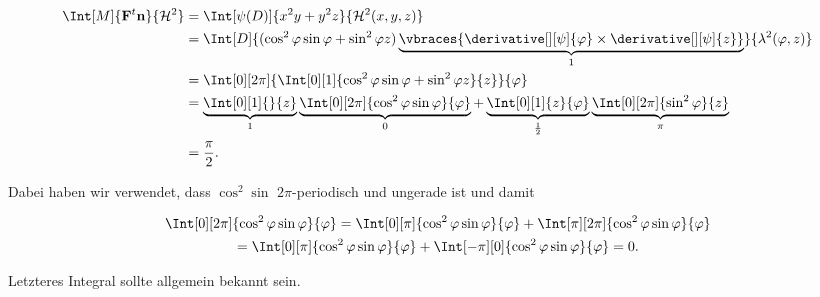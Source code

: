 \begin{solution}
\begin{enumerate}
    \begin{align*}
        \Int[M]
        {
            \mathbf F^t \mathbf n
        }{
            \mathcal H^2
        }
        & =
        \Int[\psi(D)]
        {
            x^2 y + y^2 z
        }{
            \mathcal H^2(x, y, z)
        } \\
        & =
        \Int[D]
        {
            (
                \cos^2 \varphi \sin \varphi
                +
                \sin^2 \varphi z
            )
            \underbrace
            {
                \vbraces
                {
                    \derivative[][\psi]{\varphi}
                    \times
                    \derivative[][\psi]{z}
                }
            }_1
        }{
            \lambda^2(\varphi, z)
        } \\
        & =
        \Int[0][2 \pi]
        {
            \Int[0][1]
            {
                \cos^2 \varphi \sin \varphi
                +
                \sin^2 \varphi z
            }{z}
        }{\varphi} \\
        & =
        \underbrace
        {
            \Int[0][1]{}{z}
        }_1
        \underbrace
        {
            \Int[0][2 \pi]
            {
                \cos^2 \varphi \sin \varphi
            }{\varphi}
        }_0
        +
        \underbrace
        {
            \Int[0][1]{z}{\varphi}
        }_\frac{1}{2}
        \underbrace
        {
            \Int[0][2 \pi]
            {
                \sin^2 \varphi
            }{z}
        }_\pi \\
        & =
        \frac{\pi}{2}.
    \end{align*}

    Dabei haben wir verwendet, dass $\cos^2 \sin$ $2 \pi$-periodisch und ungerade ist und damit

    \begin{multline*}
        \Int[0][2 \pi]
        {
            \cos^2 \varphi \sin \varphi
        }{\varphi}
        =
        \Int[0][\pi]
        {
            \cos^2 \varphi \sin \varphi
        }{\varphi}
        +
        \Int[\pi][2 \pi]
        {
            \cos^2 \varphi \sin \varphi
        }{\varphi} \\
        =
        \Int[0][\pi]
        {
            \cos^2 \varphi \sin \varphi
        }{\varphi}
        +
        \Int[-\pi][0]
        {
            \cos^2 \varphi \sin \varphi
        }{\varphi}
        =
        0.
    \end{multline*}

    Letzteres Integral sollte allgemein bekannt sein.


\end{enumerate}
\end{solution}

